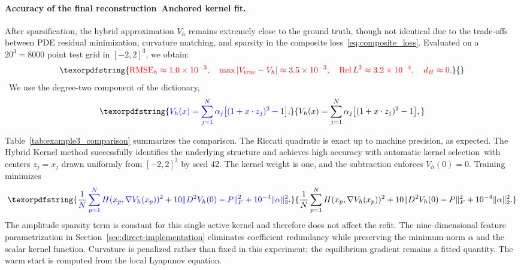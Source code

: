 \documentclass[11pt]{article}
\theoremstyle{plain}      %
\theoremstyle{definition} %
\providecommand{\DIFaddtex}[1]{{\protect\color{blue}#1}} %
\providecommand{\DIFdeltex}[1]{{\protect\color{red}#1}} %
\providecommand{\DIFaddbegin}{} %
\providecommand{\DIFaddend}{} %
\providecommand{\DIFdelbegin}{} %
\providecommand{\DIFdelend}{} %
\providecommand{\DIFadd}[1]{\texorpdfstring{\DIFaddtex{#1}}{#1}} %
\providecommand{\DIFdel}[1]{\texorpdfstring{\DIFdeltex{#1}}{}} %
\newcommand{\DIFscaledelfig}{1.0}
\newlength{\DIFdelgraphicswidth} %
\newlength{\DIFdelgraphicsheight} %
\newcommand{\DIFaddincludegraphics}[2][]{{\color{blue}\fbox{\DIFOincludegraphics[#1]{#2}}}} %
\newcommand{\DIFdelincludegraphics}[2][]{%
\sbox{\DIFdelgraphicsbox}{\DIFOincludegraphics[#1]{#2}}%
\settoboxwidth{\DIFdelgraphicswidth}{\DIFdelgraphicsbox} %
\settoboxtotalheight{\DIFdelgraphicsheight}{\DIFdelgraphicsbox} %
\scalebox{\DIFscaledelfig}{%
\parbox[b]{\DIFdelgraphicswidth}{\usebox{\DIFdelgraphicsbox}\\[-\baselineskip] \rule{\DIFdelgraphicswidth}{0em}}\llap{\resizebox{\DIFdelgraphicswidth}{\DIFdelgraphicsheight}{%
\setlength{\unitlength}{\DIFdelgraphicswidth}%
\begin{picture}(1,1)%
\thicklines\linethickness{2pt} %
{\color[rgb]{1,0,0}\put(0,0){\framebox(1,1){}}}%
{\color[rgb]{1,0,0}\put(0,0){\line( 1,1){1}}}%
{\color[rgb]{1,0,0}\put(0,1){\line(1,-1){1}}}%
\end{picture}%
}\hspace*{3pt}}} %
} %
\DeclareRobustCommand{\DIFaddbegin}{\DIFOaddbegin \let\includegraphics\DIFaddincludegraphics} %
\DeclareRobustCommand{\DIFaddend}{\DIFOaddend \let\includegraphics\DIFOincludegraphics} %
\DeclareRobustCommand{\DIFdelbegin}{\DIFOdelbegin \let\includegraphics\DIFdelincludegraphics} %
\DeclareRobustCommand{\DIFdelend}{\DIFOaddend \let\includegraphics\DIFOincludegraphics} %
\begin{document}
\DIFdelend \paragraph{\DIFdelbegin \DIFdel{Accuracy of the final reconstruction}\DIFdelend\ \DIFaddbegin \DIFadd{Anchored kernel fit}\DIFaddend .}
\DIFdelbegin \DIFdel{After sparsification, the hybrid approximation $V_h$ remains extremely close to 
the ground truth,
though not identical due to the trade-offs between PDE residual 
minimization, curvature matching, and sparsity in the composite 
loss~\eqref{eq:composite_loss}. Evaluated on a $20^3 = 8000$ point test grid in $[-2, 2]^3$, we obtain:
}\begin{displaymath}\DIFdel{\label{eq:example3_errors}
\text{RMSE}_h \approx 1.0 \times 10^{-3}, \quad 
\max|V_{\text{true}} - V_h| \approx 3.5 \times 10^{-3}, \quad 
\text{Rel}\,L^2 \approx 3.2 \times 10^{-4}, \quad 
d_H \approx 0.
}\end{displaymath}%
\DIFdelend\ \DIFaddbegin \DIFadd{We use the degree-two component of the dictionary,
}\[
 \DIFadd{V_h(x)=\sum_{j=1}^{N}\alpha_j\bigl[(1+x\cdot z_j)^2-1\bigr],
}\]\DIFaddend 
\DIFdelbegin %

\DIFdel{Table~\ref{tab:example3_comparison} summarizes the comparison. The Riccati 
quadratic is exact up to machine precision, as expected. The Hybrid Kernel 
method successfully identifies the underlying structure and achieves high accuracy 
with automatic kernel selection}\DIFdelend\ \DIFaddbegin \DIFadd{with centers $z_j=x_j$ drawn uniformly from $[-2,2]^3$ by seed 42. The kernel weight is one, and the subtraction enforces $V_h(0)=0$. Training minimizes
}\begin{equation}\DIFadd{\label{eq:quadratic-refit-loss}
 \frac{1}N\sum_{p=1}^N H(x_p,\nabla V_h(x_p))^2
 +10\|D^2V_h(0)-P\|_F^2+10^{-4}\|\alpha\|_2^2.
}\end{equation}
\DIFadd{The amplitude sparsity term is constant for this single active kernel and therefore does not affect the refit. The nine-dimensional feature parametrization in Section~\ref{sec:direct-implementation} eliminates coefficient redundancy while preserving the minimum-norm $\alpha$ and the scalar kernel function. Curvature is penalized rather than fixed in this experiment; the equilibrium gradient remains a fitted quantity. The warm start is computed from the local Lyapunov equation}\DIFaddend .
\end{document}
